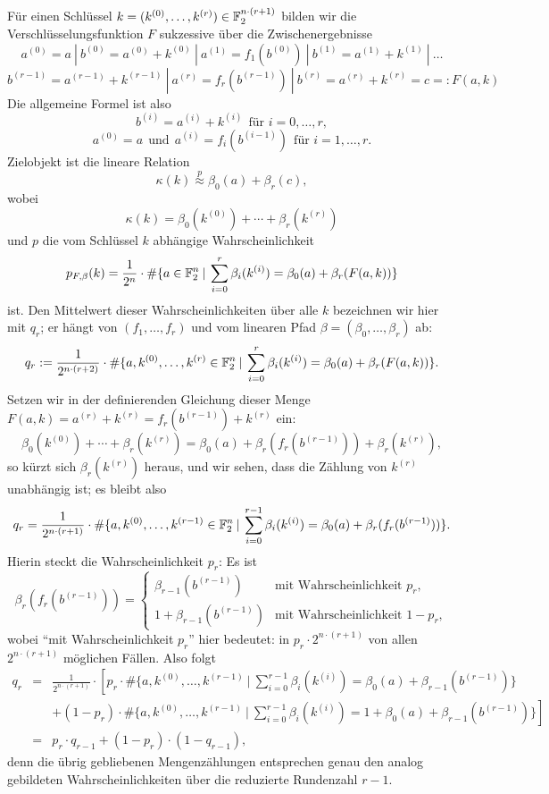 \begin{refsegment}
Für einen Schlüssel $k = (k^{(0)}, \ldots, k^{(r)}) \in \mathbb{F}_2^{n\cdot(r+1)}$
bilden wir die Verschlüsselungsfunktion $F$ sukzessive über die Zwischenergebnisse
\[
     a^{(0)} = a \:|\: b^{(0)} = a^{(0)}+k^{(0)} \:|\: a^{(1)} = f_1(b^{(0)}) \:|\:
     b^{(1)} = a^{(1)}+k^{(1)} \:|\: \ldots
\]
\[
     b^{(r-1)} = a^{(r-1)}+k^{(r-1)} \:|\: a^{(r)} = f_r(b^{(r-1)}) \:|\:
     b^{(r)} = a^{(r)}+k^{(r)} = c =: F(a,k)
\]
Die allgemeine Formel ist also
\[
     b^{(i)} = a^{(i)} + k^{(i)} \:\:\text{für } i = 0, \ldots, r,
\]
\[
     a^{(0)} = a \:\: \text{und} \:\: a^{(i)} = f_i(b^{(i-1)}) \:\:
       \text{für } i = 1, \ldots, r.
\]
Zielobjekt ist die lineare Relation
\[
     \kappa(k) \stackrel{p}{\approx} \beta_0(a) + \beta_r(c),
\]
wobei
\[
     \kappa(k) = \beta_0(k^{(0)}) + \cdots + \beta_r(k^{(r)})
\]
und $p$ die vom Schlüssel $k$ abhängige Wahrscheinlichkeit
\[
     p_{F,\beta}(k) = \frac{1}{2^n} \cdot \#\{a \in \mathbb{F}_2^n \:|\:
      \sum_{i=0}^r \beta_i(k^{(i)}) = \beta_0(a) + \beta_r(F(a,k))\}
\]
ist. Den Mittelwert dieser Wahrscheinlichkeiten über alle $k$ bezeichnen wir
hier mit $q_r$; er hängt von $(f_1, \ldots, f_r)$ und vom linearen Pfad
$\beta = (\beta_0, \ldots, \beta_r)$ ab:
\[
     q_r := \frac{1}{2^{n\cdot(r+2)}} \cdot \#\{a, k^{(0)}, \ldots, k^{(r)} \in \mathbb{F}_2^n \:|\:
      \sum_{i=0}^r \beta_i(k^{(i)}) = \beta_0(a) + \beta_r(F(a,k))\}.
\]
Setzen wir in der definierenden Gleichung dieser Menge
$F(a,k) = a^{(r)} + k^{(r)} = f_r(b^{(r-1)}) + k^{(r)}$ ein:
\[
  \beta_0(k^{(0)}) + \cdots + \beta_r(k^{(r)}) = \beta_0(a) + \beta_r(f_r(b^{(r-1)})) + \beta_r(k^{(r)}),
\]
so kürzt sich $\beta_r(k^{(r)})$ heraus, und wir sehen, dass die Zählung von $k^{(r)}$
unabhängig ist; es bleibt also
\[
     q_r = \frac{1}{2^{n\cdot(r+1)}} \cdot \#\{a, k^{(0)}, \ldots, k^{(r-1)} \in \mathbb{F}_2^n \:|\:
      \sum_{i=0}^{r-1} \beta_i(k^{(i)}) = \beta_0(a) + \beta_r(f_r(b^{(r-1)}))\}.
\]
Hierin steckt die Wahrscheinlichkeit $p_r$: Es ist
\[
     \beta_r(f_r(b^{(r-1)})) = \begin{cases}
            \beta_{r-1}(b^{(r-1)})     & \text{mit Wahrscheinlichkeit } p_r, \\
            1 + \beta_{r-1}(b^{(r-1)}) & \text{mit Wahrscheinlichkeit } 1 - p_r,
        \end{cases}
\]
wobei "`mit Wahrscheinlichkeit $p_r$"' hier bedeutet: in $p_r \cdot 2^{n\cdot(r+1)}$
von allen $2^{n\cdot(r+1)}$ möglichen Fällen. Also folgt
\begin{eqnarray*}
     q_r & = & \frac{1}{2^{n\cdot(r+1)}} \cdot \left[
            p_r \cdot \#\{a, k^{(0)}, \ldots, k^{(r-1)} \: |\:
               \sum_{i=0}^{r-1} \beta_i(k^{(i)}) = \beta_0(a) + \beta_{r-1}(b^{(r-1)})\} \right. \\
        & & \left. + (1 - p_r) \cdot \#\{a, k^{(0)}, \ldots, k^{(r-1)} \:|\:
             \sum_{i=0}^{r-1} \beta_i(k^{(i)}) = 1 + \beta_0(a) + \beta_{r-1}(b^{(r-1)})\} \right] \\
        & = & p_r \cdot q_{r-1} + (1 - p_r) \cdot (1 - q_{r-1}),
\end{eqnarray*}
denn die übrig gebliebenen Mengenzählungen entsprechen genau den analog
gebildeten Wahrscheinlichkeiten über die reduzierte Rundenzahl $r-1$.


\end{refsegment}
